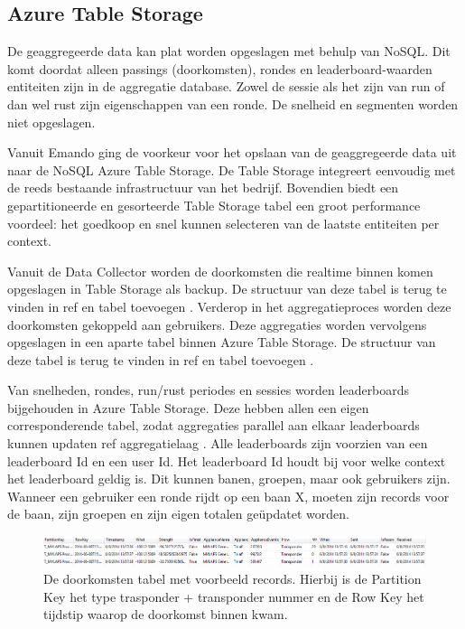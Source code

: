 \subsection{Azure Table Storage}
De geaggregeerde data kan plat worden opgeslagen met behulp van NoSQL. Dit komt doordat alleen passings (doorkomsten), rondes en leaderboard-waarden entiteiten zijn in de aggregatie database. Zowel de sessie als het zijn van run of dan wel rust zijn eigenschappen van een ronde. De snelheid en segmenten worden niet opgeslagen.

Vanuit Emando ging de voorkeur voor het opslaan van de geaggregeerde data  uit naar de NoSQL Azure Table Storage. De Table Storage integreert eenvoudig met de reeds bestaande infrastructuur van het bedrijf. Bovendien biedt een gepartitioneerde en gesorteerde Table Storage tabel een groot performance voordeel: het goedkoop en snel kunnen selecteren van de laatste entiteiten per context.

Vanuit de Data Collector worden de doorkomsten die realtime binnen komen opgeslagen in Table Storage als backup. De structuur van deze tabel is terug te vinden in {\color{red} ref en tabel toevoegen }. Verderop in het aggregatieproces worden deze doorkomsten gekoppeld aan gebruikers. Deze aggregaties worden vervolgens opgeslagen in een aparte tabel binnen Azure Table Storage. De structuur van deze tabel is terug te vinden in {\color{red} ref en tabel toevoegen }.

Van snelheden, rondes, run/rust periodes en sessies worden leaderboards bijgehouden in Azure Table Storage. Deze hebben allen een eigen corresponderende tabel, zodat aggregaties parallel aan elkaar leaderboards kunnen updaten {\color{red} ref aggregatielaag }.
Alle leaderboards zijn voorzien van een leaderboard Id en een user Id. Het leaderboard Id houdt bij voor welke context het leaderboard geldig is. Dit kunnen banen, groepen, maar ook gebruikers zijn. Wanneer een gebruiker een ronde rijdt op een baan X, moeten zijn records voor de baan, zijn groepen en zijn eigen totalen geüpdatet worden. 

\begin{figure}[ht]
  \begin{center}
  \includegraphics[width=.6\textwidth]{style/images/passingsStructure}    
  \end{center}
  \caption{De doorkomsten tabel met voorbeeld records. Hierbij is de Partition Key het type trasponder + transponder nummer en de Row Key het tijdstip waarop de doorkomst binnen kwam.}
  \label{fig:passingTableStructure}
\end{figure}

